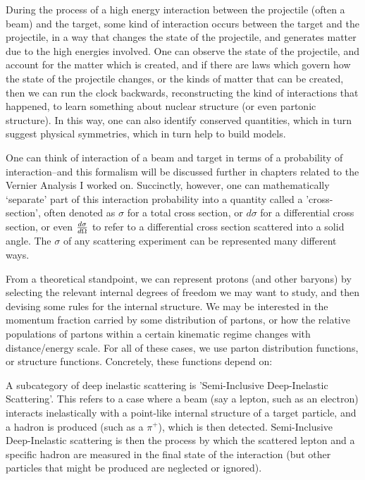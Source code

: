 During the process of a high energy interaction between the projectile (often a
beam) and the target,  some kind of interaction occurs between the target and
the projectile, in a way that changes the state of the projectile, and generates
matter due to the high energies involved. One can observe the state of the
projectile, and account for the matter which is created, and if there are laws
which govern how the state of the projectile changes, or the kinds of matter
that can be created, then we can run the clock backwards, reconstructing the
kind of interactions that happened, to learn something about nuclear structure
(or even partonic structure). In this way, one can also identify conserved
quantities, which in turn suggest physical symmetries, which in turn help to
build models.

One can think of interaction of a beam and target in terms of a probability of
interaction--and this formalism will be discussed further in chapters related
to the Vernier Analysis I worked on. Succinctly, however, one can mathematically
`separate' part of this interaction probability into a quantity called a
'cross-section', often denoted as $\sigma$ for a total cross section, or
$d\sigma$ for a differential cross section, or even ${d\sigma}\over{d\Omega}$ to
refer to a differential cross section scattered into a solid angle. The $\sigma$
of any scattering experiment can be represented many different ways.

From a theoretical standpoint, we can represent protons (and other baryons) by
selecting the relevant internal degrees of freedom we may want to study, and
then devising some rules for the internal structure. We may be interested in the
momentum fraction carried by some distribution of partons, or how the relative
populations of partons within a certain kinematic regime changes with
distance/energy scale. For all of these cases, we use parton distribution
functions, or structure functions. Concretely, these functions depend on:


A subcategory of deep inelastic scattering is 'Semi-Inclusive Deep-Inelastic
Scattering'. This refers to a case where a beam (say a lepton, such as an
electron) interacts inelastically with a point-like internal structure of a
target particle, and a hadron is produced (such as a $\pi^+$), which is then
detected. Semi-Inclusive Deep-Inelastic scattering is then the process by which
the scattered lepton and a specific hadron are measured in the final state of
the interaction (but other particles that might be produced are neglected or
ignored).

